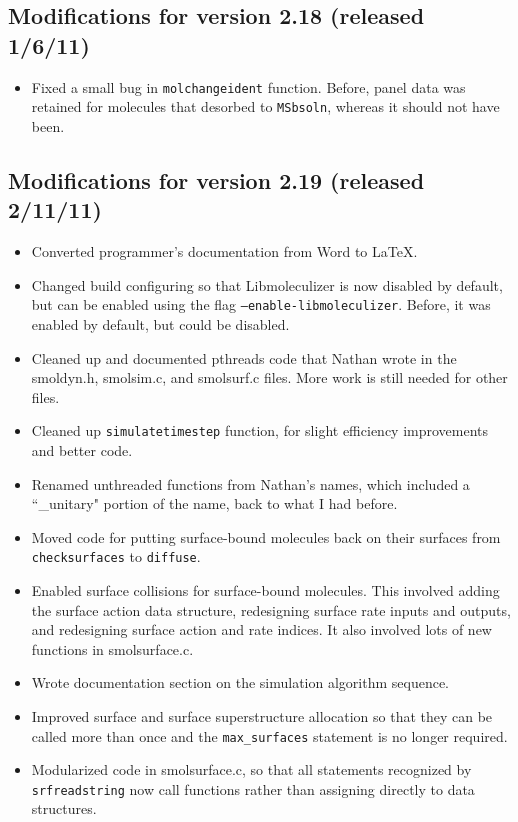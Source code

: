 \documentclass {scrbook}
\newcommand {\ttt} {\texttt}
\begin{document}
\subsection{Modifications for version 2.18 (released 1/6/11)}
\begin{itemize}
\item Fixed a small bug in \ttt{molchangeident} function. Before, panel data was retained for molecules that desorbed to \ttt{MSbsoln}, whereas it should not have been.
\end{itemize}

\subsection{Modifications for version 2.19 (released 2/11/11)}
\begin{itemize}
\item Converted programmer's documentation from Word to LaTeX.
\item Changed build configuring so that Libmoleculizer is now disabled by default, but can be enabled using the flag \ttt{--enable-libmoleculizer}. Before, it was enabled by default, but could be disabled.
\item Cleaned up and documented pthreads code that Nathan wrote in the smoldyn.h, smolsim.c, and smolsurf.c files. More work is still needed for other files.
\item Cleaned up \ttt{simulatetimestep} function, for slight efficiency improvements and better code.
\item Renamed unthreaded functions from Nathan's names, which included a ``\_unitary" portion of the name, back to what I had before.
\item Moved code for putting surface-bound molecules back on their surfaces from \ttt{checksurfaces} to \ttt{diffuse}.
\item Enabled surface collisions for surface-bound molecules. This involved adding the surface action data structure, redesigning surface rate inputs and outputs, and redesigning surface action and rate indices. It also involved lots of new functions in smolsurface.c.
\item Wrote documentation section on the simulation algorithm sequence.
\item Improved surface and surface superstructure allocation so that they can be called more than once and the \ttt{max\_surfaces} statement is no longer required.
\item Modularized code in smolsurface.c, so that all statements recognized by \ttt{srfreadstring} now call functions rather than assigning directly to data structures.

\end{itemize}
\end{document}
